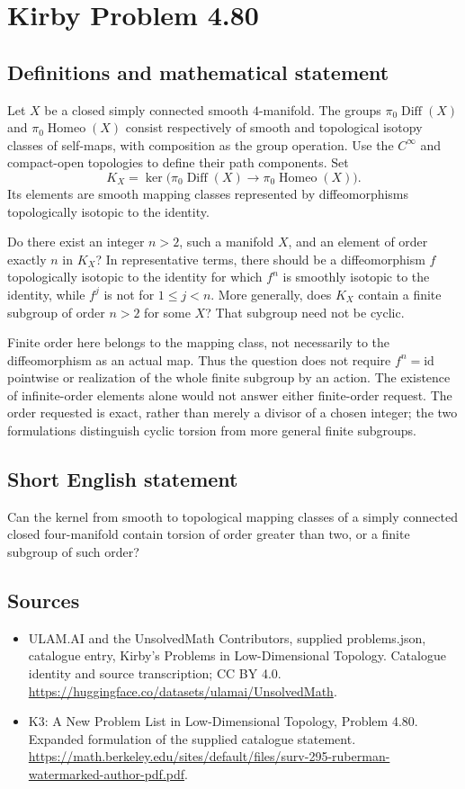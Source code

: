 \documentclass[11pt,a4paper]{article}
\begin{document}
\section*{Kirby Problem 4.80}\label{statement}

\subsection{Definitions and mathematical statement}
Let $X$ be a closed simply connected smooth $4$-manifold.
The groups $\pi_0\operatorname{Diff}(X)$ and
$\pi_0\operatorname{Homeo}(X)$ consist respectively of smooth
and topological isotopy classes of self-maps, with composition as
the group operation. Use the $C^\infty$ and compact-open
topologies to define their path components. Set
\[
 K_X=\ker\bigl(\pi_0\operatorname{Diff}(X)
           \longrightarrow\pi_0\operatorname{Homeo}(X)\bigr).
\]
Its elements are smooth mapping classes represented by diffeomorphisms
topologically isotopic to the identity.

Do there exist an integer $n>2$, such a manifold $X$, and an
element of order exactly $n$ in $K_X$? In representative terms,
there should be a diffeomorphism $f$ topologically isotopic to the
identity for which $f^n$ is smoothly isotopic to the identity,
while $f^j$ is not for $1\le j<n$.
More generally, does $K_X$ contain a finite subgroup of order
$n>2$ for some $X$? That subgroup need not be cyclic.

Finite order here belongs to the mapping class, not necessarily
to the diffeomorphism as an actual map. Thus the question does
not require $f^n=\mathrm{id}$ pointwise or realization of the
whole finite subgroup by an action. The existence of infinite-order
elements alone would not answer either finite-order request.
The order requested is exact, rather than merely a divisor of a
chosen integer; the two formulations distinguish cyclic torsion
from more general finite subgroups.
\subsection{Short English statement}
Can the kernel from smooth to topological mapping classes of a simply connected closed four-manifold contain torsion of order greater than two, or a finite subgroup of such order?
\subsection{Sources}
\begin{itemize}
\item[S1] ULAM.AI and the UnsolvedMath Contributors, supplied problems.json, catalogue entry, Kirby's Problems in Low-Dimensional Topology. Catalogue identity and source transcription; CC BY 4.0.
\url{https://huggingface.co/datasets/ulamai/UnsolvedMath}.
\item[S2] K3: A New Problem List in Low-Dimensional Topology, Problem 4.80. Expanded formulation of the supplied catalogue statement.
\url{https://math.berkeley.edu/sites/default/files/surv-295-ruberman-watermarked-author-pdf.pdf}.
\end{itemize}
\end{document}
